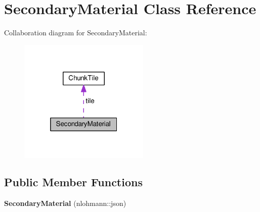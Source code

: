 \hypertarget{classSecondaryMaterial}{\section{Secondary\-Material Class Reference}
\label{classSecondaryMaterial}
}


Collaboration diagram for Secondary\-Material\-:
\nopagebreak
\begin{figure}[H]
\begin{center}
\leavevmode
\includegraphics[width=176pt]{classSecondaryMaterial__coll__graph}
\end{center}
\end{figure}
\subsection*{Public Member Functions}
\begin{DoxyCompactItemize}
\item 
\hypertarget{classSecondaryMaterial_a69b96c4aacf0309d95e0ce9270ff74ad}{{\bfseries Secondary\-Material} (nlohmann\-::json)}\label{classSecondaryMaterial_a69b96c4aacf0309d95e0ce9270ff74ad}

\end{DoxyCompactItemize}

